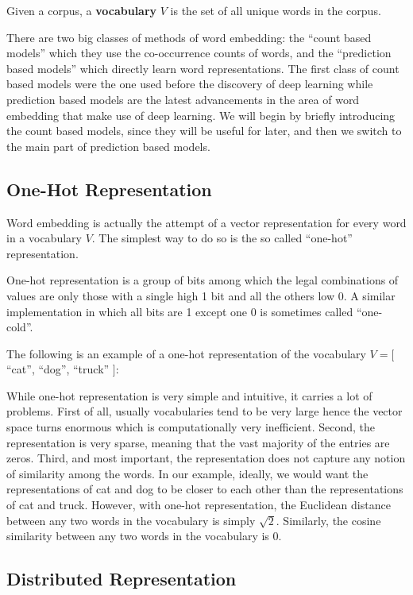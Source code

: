 \bd[Vocabulary]
Given a corpus, a \textbf{vocabulary} $V$ is the set of all unique words in the corpus.
\ed

There are two big classes of methods of word embedding: the ``count based models'' which they use the co-occurrence
counts of words, and the ``prediction based models'' which directly learn word representations. The first class of
count based models were the one used before the discovery of deep learning while prediction based models are the
latest advancements in the area of word embedding that make use of deep learning. We will begin by briefly
introducing the count based models, since they will be useful for later, and then we switch to the main part of
prediction based models.

\subsection{One-Hot Representation}

Word embedding is actually the attempt of a vector representation for every word in a vocabulary $V$. The simplest
way to do so is the so called ``one-hot'' representation.

One-hot representation is a group of bits among which the legal combinations of values are only those with a single
high 1 bit and all the others low 0. A similar implementation in which all bits are 1 except one 0 is sometimes
called ``one-cold''.
\ed

\be
The following is an example of a one-hot representation of the vocabulary $V = [$ ``cat'', ``dog'', ``truck'' $]$:

\ee

While one-hot representation is very simple and intuitive, it carries a lot of problems. First of all, usually
vocabularies tend to be very large hence the vector space turns enormous which is computationally very inefficient.
Second, the representation is very sparse, meaning that the vast majority of the entries are zeros. Third, and most
important, the representation does not capture any notion of similarity among the words. In our example, ideally, we
would want the representations of cat and dog to be closer to each other than the representations of cat and truck.
However, with one-hot representation, the Euclidean distance between any two words in the vocabulary is simply
$\sqrt{2}$. Similarly, the cosine similarity between any two words in the vocabulary is $0$.

\subsection{Distributed Representation}

